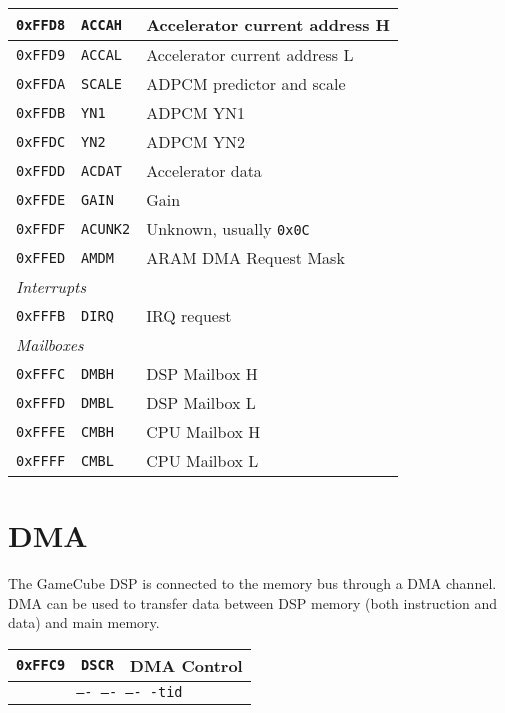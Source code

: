 \documentclass[oneside,english,a4paper,10pt,oneside,openany,final]{memoir}
\newcommand{\Address}[1]{\texttt{#1}}
\newcommand{\Register}[1]{\texttt{#1}}
\newcommand{\Value}[1]{\texttt{#1}}
\newcommand{\RegisterBitOverview}[4]{
  \begin{table}[H]
  \centering
  \begin{tabular}{|lcr|}
  \hline
  \Address{#1} & \Register{#2} & {#3} \\ \hline
  \multicolumn{3}{|c|}{\texttt{#4}}   \\ \hline
  \end{tabular}
  \end{table}
}
\begin{document}
\begin{table}[htb]
\begin{tabular}{|l|l|l|}
\Address{0xFFD8} & \Register{ACCAH}   & Accelerator current address H \\ \hline
\Address{0xFFD9} & \Register{ACCAL}   & Accelerator current address L \\ \hline
\Address{0xFFDA} & \Register{SCALE}   & ADPCM predictor and scale     \\ \hline
\Address{0xFFDB} & \Register{YN1}     & ADPCM YN1                     \\ \hline
\Address{0xFFDC} & \Register{YN2}     & ADPCM YN2                     \\ \hline
\Address{0xFFDD} & \Register{ACDAT}   & Accelerator data              \\ \hline
\Address{0xFFDE} & \Register{GAIN}    & Gain                          \\ \hline
\Address{0xFFDF} & \Register{ACUNK2}  & Unknown, usually \Value{0x0C} \\ \hline
\Address{0xFFED} & \Register{AMDM}    & ARAM DMA Request Mask         \\ \hline
\multicolumn{3}{|l|}{\textit{Interrupts}}                             \\ \hline
\Address{0xFFFB} & \Register{DIRQ}    & IRQ request                   \\ \hline
\multicolumn{3}{|l|}{\textit{Mailboxes}}                              \\ \hline
\Address{0xFFFC} & \Register{DMBH}    & DSP Mailbox H                 \\ \hline
\Address{0xFFFD} & \Register{DMBL}    & DSP Mailbox L                 \\ \hline
\Address{0xFFFE} & \Register{CMBH}    & CPU Mailbox H                 \\ \hline
\Address{0xFFFF} & \Register{CMBL}    & CPU Mailbox L                 \\ \hline
\end{tabular}
\end{table}

\pagebreak{}

\section{DMA}

The GameCube DSP is connected to the memory bus through a DMA channel. DMA can be used to transfer data between DSP memory (both instruction and data) and main memory.

\RegisterBitOverview{0xFFC9}{DSCR}{DMA Control}{---- ---- ---- -tid}
\end{document}
